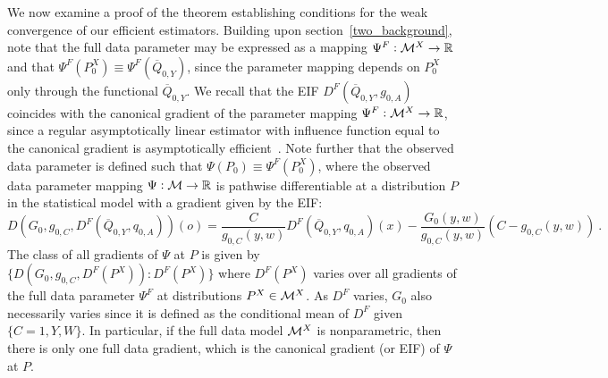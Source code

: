 We now examine a proof of the theorem establishing conditions for the weak
convergence of our efficient estimators. Building upon
section~\ref{two_background}, note that the full data parameter may be
expressed as a mapping $\Psi^F: \mathcal{M}^X \rightarrow \mathbb{R}$ and that $\Psi^F(P_0^X)
\equiv \Psi^F(\overline{Q}_{0,Y})$, since the parameter mapping depends on
$P_0^X$ only through the functional $\overline{Q}_{0,Y}$. We recall that the EIF
$D^F(\overline{Q}_{0,Y},g_{0,A})$ coincides with the canonical gradient of the
parameter mapping $\Psi^F: \mathcal{M}^X \rightarrow \mathbb{R}$, since a regular asymptotically
linear estimator with influence function equal to the canonical gradient is
asymptotically efficient~\citep{bickel1993efficient, vdl2003unified}. Note
further that the observed data parameter is defined such that $\Psi(P_0) \equiv
\Psi^F(P^X_0)$, where the observed data parameter mapping $\Psi:\mathcal{M} \rightarrow
\mathbb{R}$ is pathwise differentiable at a distribution $P$ in the statistical model
with a gradient given by the EIF:
\begin{equation*}
  D(G_0, g_{0,C}, D^{F}(\overline{Q}_{0,Y}, q_{0,A}))(o) =
  \frac{C}{g_{0,C}(y, w)} D^F(\overline{Q}_{0,Y}, q_{0,A})(x) -
  \frac{G_0(y,w)}{g_{0,C}(y,w)}(C - g_{0,C}(y,w)) \ .
\end{equation*}
The class of all gradients of $\Psi$ at $P$ is given by $\{D(G_0, g_{0,C},
D^F(P^X)): D^F(P^X)\}$ where $D^F(P^X)$ varies over all gradients of the
full data parameter $\Psi^F$ at distributions $P^X \in \mathcal{M}^X$. As $D^F$ varies,
$G_0$ also necessarily varies since it is defined as the conditional mean of
$D^F$ given $\{C = 1, Y, W\}$. In particular, if the full data model $\mathcal{M}^X$ is
nonparametric, then there is only one full data gradient, which is the canonical
gradient (or EIF) of $\Psi$ at $P$.

